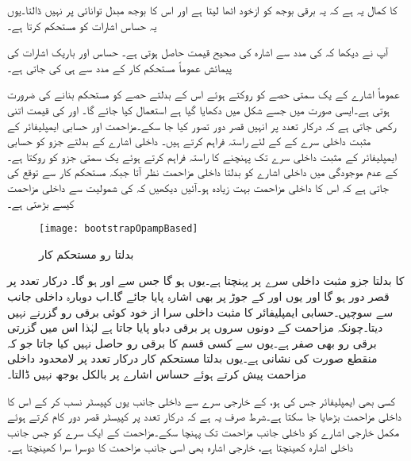  کا کمال یہ ہے کہ یہ برقی بوجھ  کو ازخود اٹھا لیتا ہے اور اس کا بوجھ مبدل توانائی پر نہیں ڈالتا۔یوں یہ حساس اشارات کو مستحکم کرتا ہے۔

آپ نے دیکھا کہ  کی مدد سے اشارہ کی صحیح قیمت حاصل ہوتی ہے۔ حساس اور باریک اشارات کی پیمائش عموماً مستحکم کار کے مدد سے ہی کی جاتی ہے۔

عموماً اشارے کے یک سمتی حصے کو روکتے ہوئے اس کے بدلتے حصے کو مستحکم بنانے کی ضرورت ہوتی ہے۔ایسی صورت میں  جسے شکل  میں دکھایا گیا ہے استعمال کیا جائے گا۔ اور  کی قیمت اتنی رکھی جاتی ہے کہ درکار تعدد پر انہیں قصر دور تصور کیا جا سکے۔مزاحمت  اور  حسابی ایمپلیفائر کے مثبت داخلی سرے  کے  کے لئے راستہ فراہم کرتے ہیں۔ داخلی اشارے کے بدلتے جزو کو حسابی ایمپلیفائر کے مثبت داخلی سرے  تک پہنچنے کا راستہ فراہم کرتے ہوئے یک سمتی جزو کو روکتا ہے۔ کے عدم موجودگی میں داخلی اشارے کو بدلتا داخلی مزاحمت  نظر آتا جبکہ مستحکم کار سے توقع کی جاتی ہے کہ اس کا داخلی مزاحمت بہت زیادہ ہو۔آئیں دیکھیں کہ  کی شمولیت سے داخلی مزاحمت کیسے بڑھتی ہے۔
\begin{figure}
\centering
\texttt{[image: bootstrapOpampBased]}
\caption{بدلتا رو مستحکم کار}
\label{شکل_بدلتا_رو_وسطی_دور}
\end{figure}
 کا بدلتا جزو  مثبت داخلی سرے پر پہنچتا ہے۔یوں  ہو گا جس سے  اور  ہو گا۔ درکار  تعدد پر قصر دور ہو گا اور یوں  اور  کے جوڑ پر بھی  اشارہ پایا جائے گا۔اب دوبارہ داخلی جانب سے سوچیں۔حسابی ایمپلیفائر کا مثبت داخلی سرا  از خود کوئی برقی رو گزرنے نہیں دیتا۔چونکہ مزاحمت  کے دونوں سروں پر  برقی دباو پایا جاتا ہے لہٰذا اس میں گزرتی برقی رو بھی صفر ہے۔یوں  سے کسی قسم کا برقی رو حاصل نہیں کیا جاتا جو کہ منقطع صورت کی نشانی ہے۔یوں بدلتا مستحکم کار درکار تعدد پر لامحدود داخلی مزاحمت پیش کرتے ہوئے حساس اشارے پر بالکل بوجھ نہیں ڈالتا۔

کسی بھی ایمپلیفائر جس کی   ہو،  کے  خارجی سرے  سے داخلی جانب یوں کپیسٹر  نسب کر کے اس کا داخلی مزاحمت بڑھایا جا سکتا ہے۔شرط صرف یہ ہے کہ درکار تعدد پر کپیسٹر قصر دور کام کرتے ہوئے مکمل خارجی اشارے کو داخلی جانب مزاحمت  تک  پہنچا سکے۔مزاحمت  کے ایک سرے کو جس جانب  داخلی اشارہ کھینچتا ہے، خارجی اشارہ بھی اسی جانب مزاحمت کا دوسرا سرا کھینچتا ہے۔

